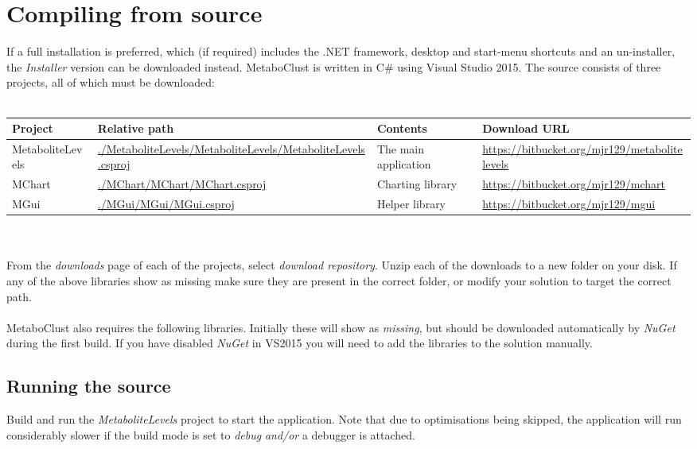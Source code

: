 \documentclass[11pt,a4paper]{article}
\newcommand{\menu}[1]{ \flqq\textit{#1}\frqq}
\begin{document}
\section{Compiling from source}
If a full installation is preferred, which (if required) includes the .NET framework, desktop and start-menu shortcuts and an un-installer, the \textit{Installer} version can be downloaded instead.
MetaboClust is written in C\# using Visual Studio 2015. The source consists of three projects, all of which must be downloaded:\\
\\
\begin{tabularx}{\linewidth}{l X X X}
	\textbf{Project} & \textbf{Relative path} & \textbf{Contents} & \textbf{Download URL} \\ \hline
	MetaboliteLevels & \url{./MetaboliteLevels/MetaboliteLevels/MetaboliteLevels.csproj} & The main application & \url{https://bitbucket.org/mjr129/metabolitelevels} \\
	MChart & \url{./MChart/MChart/MChart.csproj} & Charting library & \url{https://bitbucket.org/mjr129/mchart} \\
	MGui & \url{./MGui/MGui/MGui.csproj} & Helper library & \url{https://bitbucket.org/mjr129/mgui} \\
\end{tabularx}
\\
\\
From the \textit{downloads} page of each of the projects, select \textit{download repository}. Unzip each of the downloads to a new folder on your disk. If any of the above libraries show as missing make sure they are present in the correct folder, or modify your solution to target the correct path.
\\
\\
MetaboClust also requires the following libraries. Initially these will show as \textit{missing}, but should be downloaded automatically by \textit{NuGet} during the first build. If you have disabled \textit{NuGet} in VS2015 you will need to add the libraries to the solution manually.

\subsection{Running the source}
Build and run the \textit{MetaboliteLevels} project to start the application. Note that due to optimisations being skipped, the application will run considerably slower if the build mode is set to \menu{debug} \textit{and/or} a debugger is attached.
\end{document}
